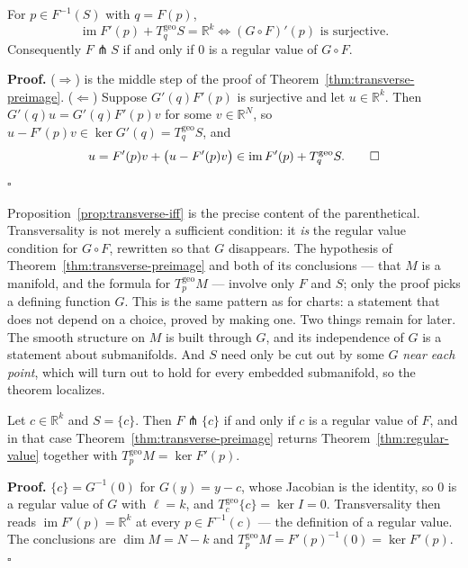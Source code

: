 \documentclass[11pt]{report}
\makeatletter
\newcounter{thmcounter}[section]
\renewenvironment{proof}[1][Proof]{\noindent\textbf{#1.} }{\hfill$\square$\par\vspace{5pt}}
\newcommand{\thmlabel}[1]{\edef\@currentlabel{\arabic{section}.\arabic{thmcounter}}\label{#1}}
\newcommand{\geo}{\mathrm{geo}}
\makeatother
\begin{document}
\begin{propbox}\thmlabel{prop:transverse-iff}
For $p \in F^{-1}(S)$ with $q = F(p)$,
\[
\operatorname{im} F'(p) + T^{\geo}_qS = \mathbb{R}^k \iff (G \circ F)'(p) \text{ is surjective.}
\]
Consequently $F \pitchfork S$ if and only if $0$ is a regular value of $G \circ F$.
\end{propbox}

\begin{proof}
($\Rightarrow$) is the middle step of the proof of Theorem~\ref{thm:transverse-preimage}. ($\Leftarrow$) Suppose $G'(q)F'(p)$ is surjective and let $u \in \mathbb{R}^k$. Then $G'(q)u = G'(q)F'(p)v$ for some $v \in \mathbb{R}^N$, so $u - F'(p)v \in \ker G'(q) = T^{\geo}_qS$, and
\[
u = F'(p)v + \big(u - F'(p)v\big) \in \operatorname{im} F'(p) + T^{\geo}_qS. \qedhere
\]
\end{proof}

\begin{rembox}\label{rem:intrinsic-statement-chosen-proof}
Proposition~\ref{prop:transverse-iff} is the precise content of the parenthetical. Transversality is not merely a sufficient condition: it \emph{is} the regular value condition for $G \circ F$, rewritten so that $G$ disappears. The hypothesis of Theorem~\ref{thm:transverse-preimage} and both of its conclusions --- that $M$ is a manifold, and the formula for $T^{\geo}_pM$ --- involve only $F$ and $S$; only the proof picks a defining function $G$. This is the same pattern as for charts: a statement that does not depend on a choice, proved by making one. Two things remain for later. The smooth structure on $M$ is built through $G$, and its independence of $G$ is a statement about submanifolds. And $S$ need only be cut out by some $G$ \emph{near each point}, which will turn out to hold for every embedded submanifold, so the theorem localizes.
\end{rembox}

\begin{corbox}\thmlabel{cor:rvt-transverse}
Let $c \in \mathbb{R}^k$ and $S = \{c\}$. Then $F \pitchfork \{c\}$ if and only if $c$ is a regular value of $F$, and in that case Theorem~\ref{thm:transverse-preimage} returns Theorem~\ref{thm:regular-value} together with $T^{\geo}_pM = \ker F'(p)$.
\end{corbox}

\begin{proof}
$\{c\} = G^{-1}(0)$ for $G(y) = y - c$, whose Jacobian is the identity, so $0$ is a regular value of $G$ with $\ell = k$, and $T^{\geo}_c\{c\} = \ker I = 0$. Transversality then reads $\operatorname{im} F'(p) = \mathbb{R}^k$ at every $p \in F^{-1}(c)$ --- the definition of a regular value. The conclusions are $\dim M = N - k$ and $T^{\geo}_pM = F'(p)^{-1}(0) = \ker F'(p)$.
\end{proof}
\end{document}
